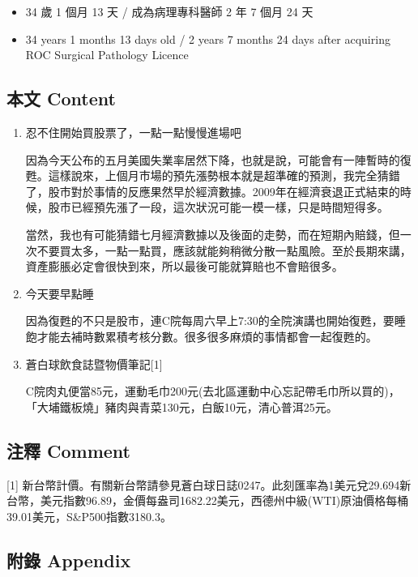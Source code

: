 \documentclass[a5paper, 11pt
]{book}
\providecommand{\tightlist}{%
  \setlength{\itemsep}{0pt}\setlength{\parskip}{0pt}}
\begin{document}
\begin{itemize}
\tightlist
\item
  34 歲 1 個月 13 天 / 成為病理專科醫師 2 年 7 個月 24 天
\item
  34 years 1 months 13 days old / 2 years 7 months 24 days after
  acquiring ROC Surgical Pathology Licence
\end{itemize}

\hypertarget{ux672cux6587-content-4}{%
\subsection{本文 Content}\label{ux672cux6587-content-4}}

\begin{enumerate}
\def\labelenumi{\arabic{enumi}.}
\item
  忍不住開始買股票了，一點一點慢慢進場吧

  因為今天公布的五月美國失業率居然下降，也就是說，可能會有一陣暫時的復甦。這樣說來，上個月市場的預先漲勢根本就是超準確的預測，我完全猜錯了，股市對於事情的反應果然早於經濟數據。2009年在經濟衰退正式結束的時候，股市已經預先漲了一段，這次狀況可能一模一樣，只是時間短得多。

  當然，我也有可能猜錯七月經濟數據以及後面的走勢，而在短期內賠錢，但一次不要買太多，一點一點買，應該就能夠稍微分散一點風險。至於長期來講，資產膨脹必定會很快到來，所以最後可能就算賠也不會賠很多。
\item
  今天要早點睡

  因為復甦的不只是股市，連C院每周六早上7:30的全院演講也開始復甦，要睡飽才能去補時數累積考核分數。很多很多麻煩的事情都會一起復甦的。
\item
  蒼白球飲食誌暨物價筆記{[}1{]}

  C院肉丸便當85元，運動毛巾200元(去北區運動中心忘記帶毛巾所以買的)，「大埔鐵板燒」豬肉與青菜130元，白飯10元，清心普洱25元。
\end{enumerate}

\hypertarget{ux6ce8ux91cb-comment-4}{%
\subsection{注釋 Comment}\label{ux6ce8ux91cb-comment-4}}

{[}1{]}
新台幣計價。有關新台幣請參見蒼白球日誌0247。此刻匯率為1美元兌29.694新台幣，美元指數96.89，金價每盎司1682.22美元，西德州中級(WTI)原油價格每桶39.01美元，S\&P500指數3180.3。

\hypertarget{ux9644ux9304-appendix-4}{%
\subsection{附錄 Appendix}\label{ux9644ux9304-appendix-4}}
\end{document}
